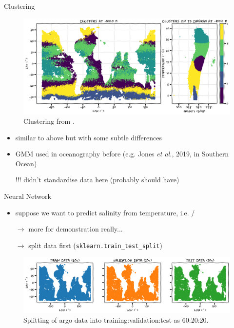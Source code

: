 \documentclass[xcolor=x11names,compress]{beamer}
\renewcommand{\(}{\begin{columns}}
\renewcommand{\)}{\end{columns}}
\newcommand{\<}[1]{\begin{column}{#1}}
\renewcommand{\>}{\end{column}}
\begin{document}
\begin{frame}{Clustering}

\begin{figure}
  \includegraphics[width=\textwidth]{argo_data_GMM}
  \caption{Clustering from .}
\end{figure}

\begin{itemize}
  \item similar to above but with some subtle differences
  \item GMM used in oceanography before {\tiny (e.g. Jones \emph{et al.}, 2019,
  in Southern Ocean)}
  \item[]
  \item[!!!] didn't standardise data here {\tiny (probably should have)}
\end{itemize}

\end{frame}


\begin{frame}{Neural Network}

\begin{itemize}
  \item suppose we want to predict salinity from temperature, i.e.
  /
  \item[] $\to$ more for demonstration really...
  \item[] $\to$ split data first (\texttt{sklearn.train\_test\_split})
\end{itemize}

\begin{figure}
  \includegraphics[width=\textwidth]{argo_data_train}
  \caption{Splitting of argo data into training:validation:test as 60:20:20.}
\end{figure}

\end{frame}
\end{document}
